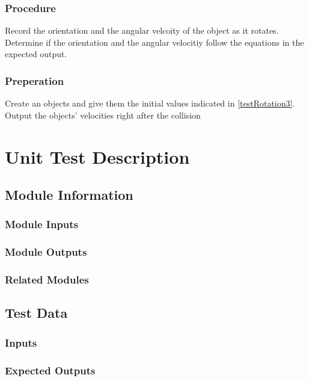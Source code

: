 \documentclass[12pt]{article}
\begin{document}
\subsubsection{Procedure}
Record the orientation and the angular velcoity of the object as it rotates. Determine if the 
orientation and the angular velocitiy follow the equations in the expected output.  

\subsubsection{Preperation}
Create an objects and give them the initial values indicated in \ref{testRotation3}.
Output the objects' velocities right after the collision
%
%
\section{Unit Test Description}


\subsection{Module Information}

\subsubsection{Module Inputs}

\subsubsection{Module Outputs}

\subsubsection{Related Modules}

\subsection{Test Data}

\subsubsection{Inputs}

\subsubsection{Expected Outputs}
\end{document}
